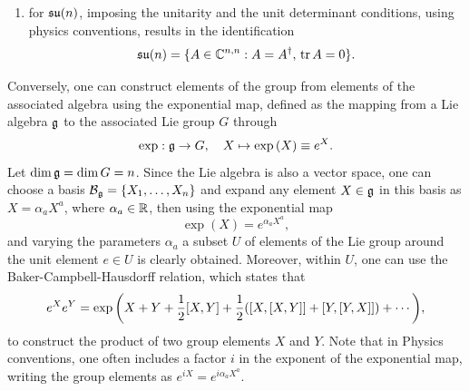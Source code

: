 \begin{ex}
\begin{enumerate}
        \begin{equation}
            \ua(n) = \{A \in \C^{n,n} : A = A^\dg\};
        \end{equation}
        \item for $\mathfrak{su}(n)$, imposing the unitarity and the unit determinant conditions, using physics conventions, results in the identification
        \begin{equation}
            \mathfrak{su}(n) = \{A \in \mathbb{C}^{n,n} : A = A^\dagger,\,\mathrm{tr}\,{A} = 0\}.
        \end{equation}
    \end{enumerate}
\end{ex}
Conversely, one can construct elements of the group from elements of the associated algebra using the exponential map, defined as the mapping from a Lie algebra $\mathfrak{g}$ to the associated Lie group $G$ through
\begin{equation}
    \exp : \mathfrak{g} \to G,\quad X \mapsto \exp{(X)} \equiv e^X.
\end{equation}
Let $\dim{\mathfrak{g}} = \dim{G} = n$. Since the Lie algebra is also a vector space, one can choose a basis $\mathcal{B}_{\mathfrak{g}} = \{X_1,\dots,X_n\}$ and expand any element $X \in \mathfrak{g}$ in this basis as $X = \alpha_aX^a$, where $\alpha_a \in \mathbb{R}$, then using the exponential map 
\begin{equation}
    \exp{(X)} = e^{\alpha_aX^a},
\end{equation}
and varying the parameters $\alpha_a$ a subset $U$ of elements of the Lie group around the unit element $e \in U$ is clearly obtained. Moreover, within $U$, one can use the Baker-Campbell-Hausdorff relation, which states that
\begin{equation}
    e^Xe^Y = \exp{\bigg(X + Y + \frac{1}{2}[X,Y] + \frac{1}{2}([X,[X,Y]] + [Y,[Y,X]]) + \cdots\bigg)},
\end{equation}
to construct the product of two group elements $X$ and $Y$. Note that in Physics conventions, one often includes a factor $i$ in the exponent of the exponential map, writing the group elements as $e^{iX} = e^{i\alpha_aX^a}$.

